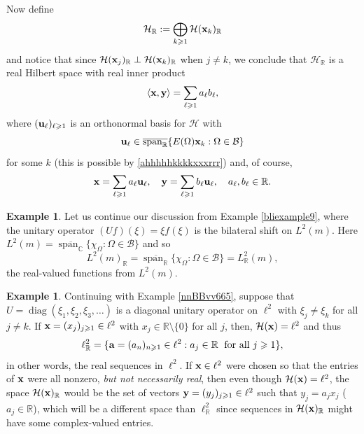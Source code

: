 \documentclass{dis}
\theoremstyle{plain}
\theoremstyle{definition}
\newtheorem{Example}[equation]{Example}
\def\C{\mathbb{C}}
\def\R{\mathbb{R}}
\renewcommand{\geq}{\geqslant}
\renewcommand{\vec}[1]{{\bf #1}}
\newcommand{\0}{{\color{lightgray}0}}
\begin{document}
Now define
\begin{equation}\label{HrrRR}
\mathcal{H}_{\R} := \bigoplus_{k \geq 1} \mathcal{H}(\vec{x}_k)_{\R}
\end{equation}
 and notice that since $\mathcal{H}(\vec{x}_j)_{\R} \perp \mathcal{H}(\vec{x}_k)_{\R}$ when $j \not = k$,  we conclude that $\mathcal{H}_{\R}$ is a real Hilbert space with real inner product
 \begin{equation}\label{55ttreaaallll}
\langle \vec{x}, \vec{y}\rangle =\sum_{\ell \geq 1} a_{\ell} b_{\ell},
\end{equation}
where $(\vec{u}_{\ell})_{\ell \geq 1}$ is an orthonormal basis for $\mathcal{H}$ with 
\begin{equation}\label{dfgjdfg88810ooO}
\vec{u}_{\ell} \in  \overline{\operatorname{span}_{\R}}\{E(\Omega) \vec{x}_{k}: \Omega \in \mathcal{B}\}
\end{equation} for some $k$ (this is possible by \eqref{ahhhhhkkkkxxxrrr}) and, of course,
$$\vec{x} = \sum_{\ell \geq 1} a_{\ell} \vec{u}_{\ell}, \quad \vec{y} = \sum_{\ell \geq 1} b_{\ell} \vec{u}_{\ell}, \quad a_{\ell}, b_{\ell} \in \R.$$

\begin{Example}\label{bsdlfjnbvdccvbVSDf}
Let us continue our discussion from  Example \ref{bliexample9}, where the unitary operator $(U f)(\xi) = \xi f(\xi)$ is the bilateral shift on $L^2(m)$. Here
$L^2(m) = \overline{\operatorname{span}_{\C}} \{\chi_{\Omega}: \Omega \in \mathcal{B}\}$ and so 
$$L^2(m)_{\R} = \overline{\operatorname{span}_{\R}}\{\chi_{\Omega}: \Omega \in \mathcal{B}\} = L^{2}_{\R}(m),$$
the real-valued functions from $L^2(m)$.
\end{Example}

\begin{Example}\label{werfg6yhbbBNJKJHGJKIUJH}
Continuing with Example \ref{nnBBvv665}, suppose that 
$U = \operatorname{diag}(\xi_1, \xi_2, \xi_3, \ldots)$ is a diagonal unitary operator on $\ell^2$ with $\xi_j \not = \xi_k$ for all $j \not = k$. If $ \vec{x} = (x_j)_{j \geq 1} \in \ell^2$ with $x_j \in \R \setminus \{0\}$ for all $j$, then, $\mathcal{H}(\vec{x}) = \ell^2$ and thus 
$$\ell^{2}_{\R} = \{\vec{a} = (a_n)_{n \geq 1} \in \ell^2: \mbox{$a_j \in \R \; $ for all $j \geq 1$}\},$$
in other words, the real sequences in $\ell^2$. If $\vec{x} \in \ell^2$ were chosen so that the entries of $\vec{x}$ were all nonzero, {\em but not necessarily real}, then even though $\mathcal{H}(\vec{x}) = \ell^2$, the space $\mathcal{H}(\vec{x})_{\R}$ would be the set of vectors $\vec{y} = (y_j)_{j \geq 1} \in \ell^2$ such that $y_j = a_j x_j$ ($a_j \in \R$), which will be a different space than $\ell^2_{\R}$ since sequences in $\mathcal{H}(\vec{x})_{\R}$ might have some complex-valued entries. 
\end{Example}
\end{document}
